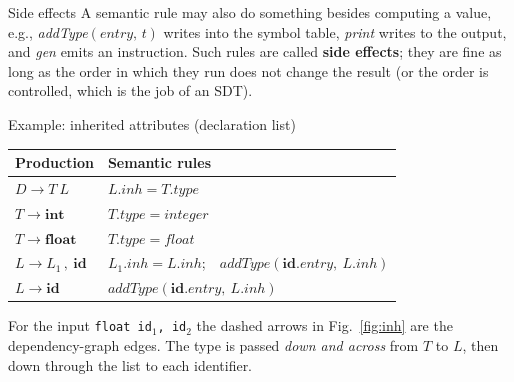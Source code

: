 \documentclass[11pt,a4paper]{article}
\newcommand{\at}[2]{\ensuremath{#1.\mathit{#2}}}
\begin{document}
\begin{notebox}{Side effects}
A semantic rule may also do something besides computing a value, e.g., \textit{addType}$(\mathit{entry},\,t)$ writes into the symbol table, \textit{print} writes to the output, and \textit{gen} emits an instruction. Such rules are called \textbf{side effects}; they are fine as long as the order in which they run does not change the result (or the order is controlled, which is the job of an SDT).
\end{notebox}

\begin{examplebox}{Example: inherited attributes (declaration list)}
\begin{center}
\small
\begin{tabular}{@{}l l@{}}
\toprule
\textbf{Production} & \textbf{Semantic rules} \\ \midrule
$D \to T\ L$ & $\at{L}{inh} = \at{T}{type}$ \\
$T \to \mathbf{int}$ & $\at{T}{type} = integer$ \\
$T \to \mathbf{float}$ & $\at{T}{type} = float$ \\
$L \to L_1\,,\ \mathbf{id}$ & $\at{L_1}{inh} = \at{L}{inh}$;\ \ $\mathit{addType}(\at{\mathbf{id}}{entry},\ \at{L}{inh})$ \\
$L \to \mathbf{id}$ & $\mathit{addType}(\at{\mathbf{id}}{entry},\ \at{L}{inh})$ \\ \bottomrule
\end{tabular}
\end{center}

For the input \texttt{float id$_1$, id$_2$} the dashed arrows in Fig.~\ref{fig:inh} are the dependency-graph edges. The type is passed \emph{down and across} from $T$ to $L$, then down through the list to each identifier.


\end{examplebox}
\end{document}
